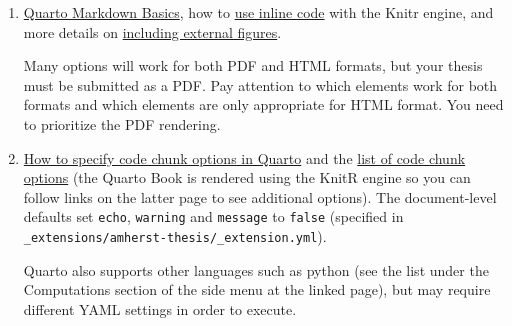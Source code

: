 \documentclass[
  11pt,
  letterpaper,
  twoside]{report}
\begin{document}
\begin{enumerate}
\def\labelenumi{\arabic{enumi}.}
\item
  \href{https://quarto.org/docs/authoring/markdown-basics.html}{Quarto
  Markdown Basics}, how to
  \href{https://quarto.org/docs/computations/inline-code.html}{use
  inline code} with the Knitr engine, and more details on
  \href{https://quarto.org/docs/authoring/figures.html}{including
  external figures}.

  \begin{tcolorbox}[enhanced jigsaw, coltitle=black, leftrule=.75mm, titlerule=0mm, rightrule=.15mm, toprule=.15mm, opacityback=0, colbacktitle=quarto-callout-note-color!10!white, breakable, colback=white, left=2mm, opacitybacktitle=0.6, bottomtitle=1mm, bottomrule=.15mm, colframe=quarto-callout-note-color-frame, title=\textcolor{quarto-callout-note-color}{\faInfo}\hspace{0.5em}{Note}, arc=.35mm, toptitle=1mm]

  Many options will work for both PDF and HTML formats, but your thesis
  must be submitted as a PDF. Pay attention to which elements work for
  both formats and which elements are only appropriate for HTML format.
  You need to prioritize the PDF rendering.

  \end{tcolorbox}
\item
  \href{https://quarto.org/docs/computations/r.html\#chunk-options}{How
  to specify code chunk options in Quarto} and the
  \href{https://quarto.org/docs/computations/execution-options.html}{list
  of code chunk options} (the Quarto Book is rendered using the KnitR
  engine so you can follow links on the latter page to see additional
  options). The document-level defaults set \texttt{echo},
  \texttt{warning} and \texttt{message} to \texttt{false} (specified in
  \texttt{\_extensions/amherst-thesis/\_extension.yml}).

  \begin{tcolorbox}[enhanced jigsaw, coltitle=black, leftrule=.75mm, titlerule=0mm, rightrule=.15mm, toprule=.15mm, opacityback=0, colbacktitle=quarto-callout-note-color!10!white, breakable, colback=white, left=2mm, opacitybacktitle=0.6, bottomtitle=1mm, bottomrule=.15mm, colframe=quarto-callout-note-color-frame, title=\textcolor{quarto-callout-note-color}{\faInfo}\hspace{0.5em}{Note}, arc=.35mm, toptitle=1mm]

  Quarto also supports other languages such as python (see the list
  under the Computations section of the side menu at the linked page),
  but may require different YAML settings in order to execute.


\end{tcolorbox}
\end{enumerate}
\end{document}
